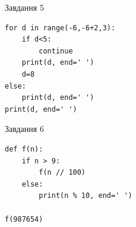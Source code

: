 \documentclass[12pt, ukrainian]{article}
\begin{document}
{\vspace{15mm}
\begin{minipage}[t]{9.7cm}                
{\begin{center}Завдання {5}\end{center}}
\begin{verbatim}
for d in range(-6,-6+2,3):
    if d<5:
        continue
    print(d, end=' ')
    d=8
else:
    print(d, end=' ')
print(d, end=' ')
\end{verbatim}     
\end{minipage}
\vline \hspace{8mm}
\begin{minipage}[t]{8.0cm}                
{\begin{center}Завдання {6}\end{center}}
\begin{verbatim}
def f(n):
    if n > 9:
        f(n // 100)
    else:
        print(n % 10, end=' ')

f(987654)
\end{verbatim}     
\end{minipage}

}
\newpage
\end{document}

